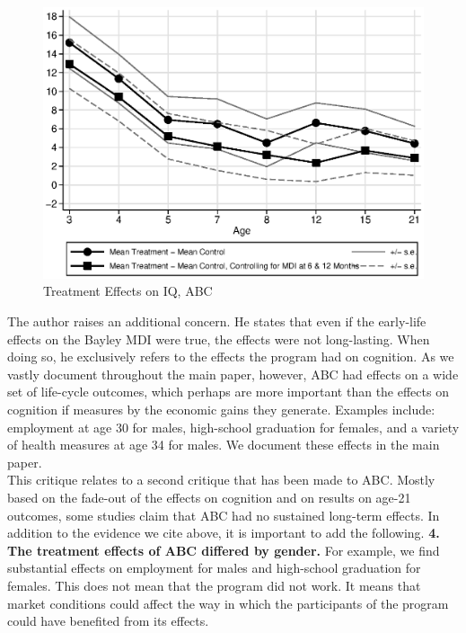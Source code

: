 \begin{appendices}
\begin{figure}[H]
		\caption{Treatment Effects on IQ, ABC} \label{fig:treatiqsabc}
		\includegraphics[width=.9\columnwidth]{output/abc_mdifixing_2.eps}
\end{figure}

\noindent The author raises an additional concern. He states that even if the early-life effects on the Bayley MDI were true, the effects were not long-lasting. When doing so, he exclusively refers to the effects the program had on cognition. As we vastly document throughout the main paper, however, ABC had effects on a wide set of life-cycle outcomes, which perhaps are more important than the effects on cognition if measures by the economic gains they generate. Examples include: employment at age 30 for males, high-school graduation for females, and a variety of health measures at age 34 for males. We document these effects in the main paper.\\

\noindent This critique relates to a second critique that has been made to ABC. Mostly based on the fade-out of the effects on cognition and on results on age-21 outcomes, some studies claim that ABC had no sustained long-term effects. In addition to the evidence we cite above, it is important to add the following. \textbf{4. The treatment effects of ABC differed by gender.} For example, we find substantial effects on employment for males and high-school graduation for females. This does not mean that the program did not work. It means that market conditions could affect the way in which the participants of the program could have benefited from its effects.\\


\end{appendices}
